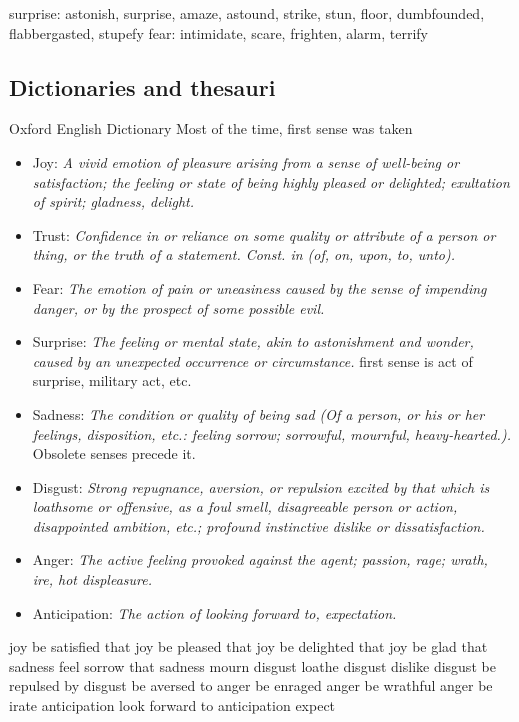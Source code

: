 surprise: astonish, surprise, amaze, astound, strike, stun, floor, dumbfounded, flabbergasted, stupefy
fear: intimidate, scare, frighten, alarm, terrify



\subsection{Dictionaries and thesauri}

Oxford English Dictionary
Most of the time, first sense was taken
\begin{itemize}
	\item Joy: \textit{A vivid emotion of pleasure arising from a sense of well-being or satisfaction; the feeling or state of being highly pleased or delighted; exultation of spirit; gladness, delight.}
	\item Trust: \textit{Confidence in or reliance on some quality or attribute of a person or thing, or the truth of a statement. Const. in (of, on, upon, to, unto).}
	\item Fear: \textit{The emotion of pain or uneasiness caused by the sense of impending danger, or by the prospect of some possible evil.}
	\item Surprise: \textit{The feeling or mental state, akin to astonishment and wonder, caused by an unexpected occurrence or circumstance.} first sense is act of surprise, military act, etc.
	\item Sadness: \textit{The condition or quality of being sad (Of a person, or his or her feelings, disposition, etc.: feeling sorrow; sorrowful, mournful, heavy-hearted.).} Obsolete senses precede it.
	\item Disgust: \textit{Strong repugnance, aversion, or repulsion excited by that which is loathsome or offensive, as a foul smell, disagreeable person or action, disappointed ambition, etc.; profound instinctive dislike or dissatisfaction.}
	\item Anger: \textit{The active feeling provoked against the agent; passion, rage; wrath, ire, hot displeasure.}
	\item Anticipation: \textit{The action of looking forward to, expectation.}
\end{itemize}
joy	be satisfied that
joy	be pleased that
joy	be delighted that
joy	be glad that
sadness	feel sorrow that
sadness mourn
disgust	loathe
disgust dislike
disgust be repulsed by
disgust be aversed to
anger	be enraged
anger	be wrathful
anger	be irate
anticipation	look forward to
anticipation expect


